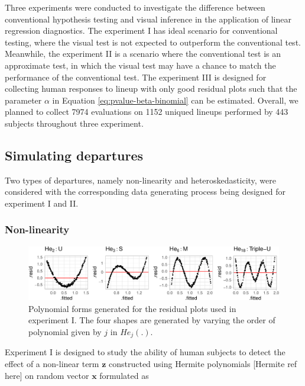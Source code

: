 \documentclass[]{interact}
\theoremstyle{plain}%
\theoremstyle{definition}
\theoremstyle{remark}
\begin{document}
Three experiments were conducted to investigate the difference between
conventional hypothesis testing and visual inference in the application
of linear regression diagnostics. The experiment I has ideal scenario
for conventional testing, where the visual test is not expected to
outperform the conventional test. Meanwhile, the experiment II is a
scenario where the conventional test is an approximate test, in which
the visual test may have a chance to match the performance of the
conventional test. The experiment III is designed for collecting human
responses to lineup with only good residual plots such that the
parameter \(\alpha\) in Equation \ref{eq:pvalue-beta-binomial} can be
estimated. Overall, we planned to collect 7974 evaluations on 1152
uniqued lineups performed by 443 subjects throughout three experiment.

\hypertarget{simulating-departures}{%
\subsection{Simulating departures}\label{simulating-departures}}

Two types of departures, namely non-linearity and heteroskedasticity,
were considered with the corresponding data generating process being
designed for experiment I and II.

\hypertarget{non-linearity}{%
\subsubsection{Non-linearity}\label{non-linearity}}

\begin{figure}

{\centering \includegraphics[width=1\linewidth]{paper_comparison_files/figure-latex/different-shape-of-herimite-1} 

}

\caption{Polynomial forms generated for the residual plots used in experiment I. The four shapes are generated by varying the order of polynomial given by $j$ in $He_j(.)$.}\label{fig:different-shape-of-herimite}
\end{figure}

Experiment I is designed to study the ability of human subjects to
detect the effect of a non-linear term \(\boldsymbol{z}\) constructed
using Hermite polynomials {[}Hermite ref here{]} on random vector
\(\boldsymbol{x}\) formulated as
\end{document}
